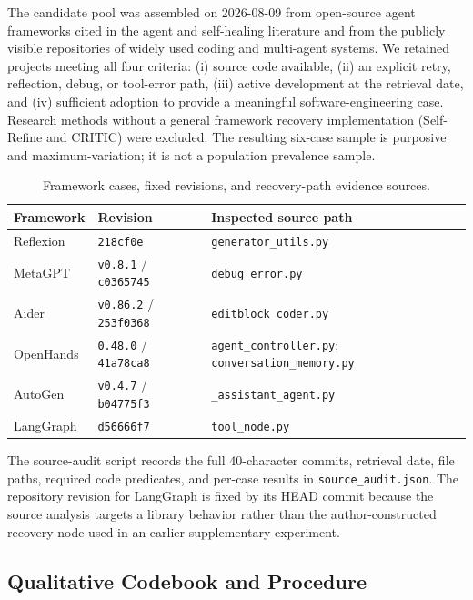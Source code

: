 The candidate pool was assembled on 2026-08-09 from open-source agent
frameworks cited in the agent and self-healing literature and from the
publicly visible repositories of widely used coding and multi-agent systems.
We retained projects meeting all four criteria: (i) source code available, (ii)
an explicit retry, reflection, debug, or tool-error path, (iii) active
development at the retrieval date, and (iv) sufficient adoption to provide a
meaningful software-engineering case. Research methods without a general
framework recovery implementation (Self-Refine and CRITIC) were excluded.
The resulting six-case sample is purposive and maximum-variation; it is not a
population prevalence sample.

\begin{table}[htbp]
\centering
\small
\caption{Framework cases, fixed revisions, and recovery-path evidence sources.}
\label{tab:framework-revisions}
\begin{tabular}{p{2.0cm}p{2.0cm}p{5.0cm}}
\toprule
\textbf{Framework} & \textbf{Revision} & \textbf{Inspected source path} \\
\midrule
Reflexion & \texttt{218cf0e} & \texttt{generator\_utils.py} \\
MetaGPT & \texttt{v0.8.1} / \texttt{c0365745} & \texttt{debug\_error.py} \\
Aider & \texttt{v0.86.2} / \texttt{253f0368} & \texttt{editblock\_coder.py} \\
OpenHands & \texttt{0.48.0} / \texttt{41a78ca8} & \texttt{agent\_controller.py}; \texttt{conversation\_memory.py} \\
AutoGen & \texttt{v0.4.7} / \texttt{b04775f3} & \texttt{\_assistant\_agent.py} \\
LangGraph & \texttt{d56666f7} & \texttt{tool\_node.py} \\
\bottomrule
\end{tabular}
\end{table}

The source-audit script records the full 40-character commits, retrieval date,
file paths, required code predicates, and per-case results in
\texttt{source\_audit.json}. The
repository revision for LangGraph is fixed by its HEAD commit because the
source analysis targets a library behavior rather than the author-constructed
recovery node used in an earlier supplementary experiment.

\subsection{Qualitative Codebook and Procedure}
\label{sec:method-taxonomy}

